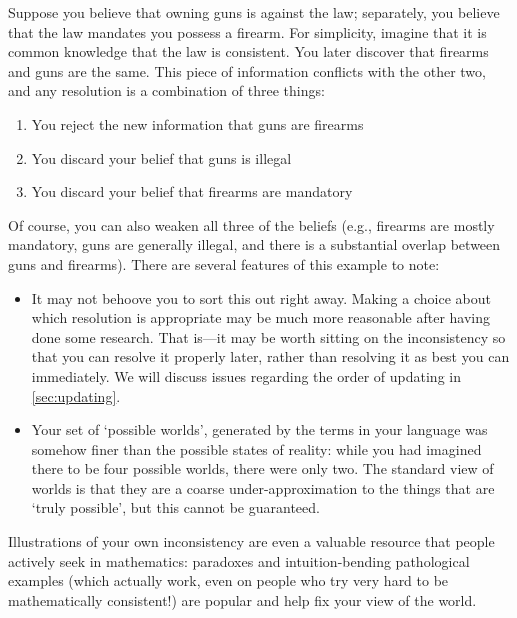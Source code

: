 \documentclass{article}
\begin{document}
	\begin{example}
		Suppose you believe that owning guns is against the law; separately, you believe that the law mandates you possess a firearm. For simplicity, imagine that it is common knowledge that the law is consistent. You later discover that firearms and guns are the same. This piece of information conflicts with the other two, and any resolution is a combination of three things:
		\begin{enumerate}[nosep]
			\item You reject the new information that guns are firearms 
			\item You discard your belief that guns is illegal
			\item You discard your belief that firearms are mandatory
		\end{enumerate}
		Of course, you can also weaken all three of the beliefs (e.g., firearms are mostly mandatory, guns are generally illegal, and there is a substantial overlap between guns and firearms). There are several features of this example to note:
		
		\begin{itemize}
			\item It may not behoove you to sort this out right away. Making a choice about which resolution is appropriate may be much more reasonable after having done some research. That is---it may be worth sitting on the inconsistency so that you can resolve it properly later, rather than resolving it as best you can immediately. We will discuss issues regarding the order of updating in \cref{sec:updating}.
			
			\item Your set of `possible worlds', generated by the terms in your language was somehow finer than the possible states of reality: while you had imagined there to be four possible worlds, there were only two. The standard view of worlds is that they are a coarse under-approximation to the things that are `truly possible', but this cannot be guaranteed.
			 
			
		\end{itemize} 
	\end{example}
	\begin{example}
		Illustrations of your own inconsistency are even a valuable resource that people actively seek in mathematics: paradoxes and intuition-bending pathological examples (which actually work, even on people who try very hard to be mathematically consistent!) are popular and help fix your view of the world.
	\end{example}
	
\end{document}
